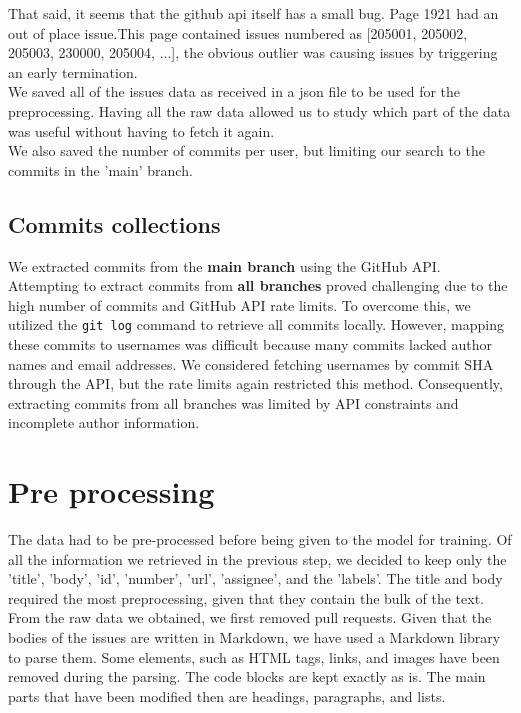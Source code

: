 \documentclass[tikz,10pt,fleqn]{article}
\begin{document}
That said, it seems that the github api itself has a small bug. Page 1921 had an out of place issue.\newpage This page contained issues numbered as [205001, 205002, 205003, 230000, 205004, ...], the obvious outlier was causing issues by triggering an early termination.\\
We saved all of the issues data as received in a json file to be used for the preprocessing. Having all the raw data allowed us to study which part of the data was useful without having to fetch it again.\\

We also saved the number of commits per user, but limiting our search to the commits in the 'main' branch.
\subsection*{Commits collections}
We extracted commits from the \textbf{main branch} using the GitHub API. Attempting to extract commits from \textbf{all branches} proved challenging due to the high number of commits and GitHub API rate limits. To overcome this, we utilized the \texttt{git log} command to retrieve all commits locally. However, mapping these commits to usernames was difficult because many commits lacked author names and email addresses. We considered fetching usernames by commit SHA through the API, but the rate limits again restricted this method. Consequently, extracting commits from all branches was limited by API constraints and incomplete author information.



\section*{Pre processing}

The data had to be pre-processed before being given to the model for training.  
Of all the information we retrieved in the previous step, we decided to keep only the 'title', 'body', 'id', 'number', 'url', 'assignee', and the 'labels'.  
The title and body required the most preprocessing, given that they contain the bulk of the text.  
From the raw data we obtained, we first removed pull requests.  
Given that the bodies of the issues are written in Markdown, we have used a Markdown library to parse them.  
Some elements, such as HTML tags, links, and images have been removed during the parsing. The code blocks are kept exactly as is.  
The main parts that have been modified then are headings, paragraphs, and lists.
\end{document}
